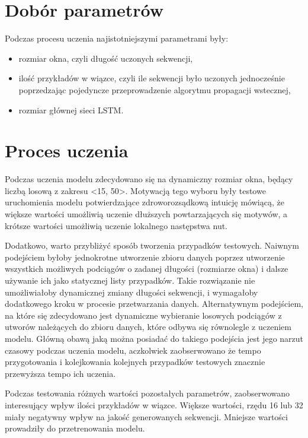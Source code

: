 {    \section{Dobór parametrów}
    {
        Podczas procesu uczenia najistotniejszymi parametrami były:
        \begin{itemize}
            \setlength\itemsep{-0.5em}
            \item rozmiar okna, czyli długość uczonych sekwencji,
            \item ilość przykładów w\,\,wiązce, czyli ile sekwencji było uczonych jednocześnie
            poprzedzając pojedyncze przeprowadzenie algorytmu propagacji wstecznej,
            \item rozmiar głównej sieci LSTM.
        \end{itemize}
    }

    \section{Proces uczenia}
    {
        Podczas uczenia modelu zdecydowano się na dynamiczny rozmiar okna,
        będący liczbą losową z\,\,zakresu <15, 50>. Motywacją tego wyboru były testowe 
        uruchomienia modelu potwierdzające zdroworozsądkową intuicję mówiącą, że większe wartości
        umożliwią uczenie dłuższych powtarzających się motywów, a\,\,krótsze wartości umożliwią uczenie lokalnego następstwa nut.

        Dodatkowo, warto przybliżyć sposób tworzenia przypadków testowych. Naiwnym podejściem byłoby
        jednokrotne utworzenie zbioru danych poprzez utworzenie wszystkich możliwych podciągów o\,\,zadanej
        długości (rozmiarze okna) i\,\,dalsze używanie ich jako statycznej listy przypadków. 
        Takie rozwiązanie nie umożliwiałoby dynamicznej zmiany długości sekwencji, i\,\,wymagałoby dodatkowego 
        kroku w\,\,procesie przetwarzania danych. Alternatywnym podejściem, na które się zdecydowano jest dynamiczne
        wybieranie losowych podciągów z\,\,utworów należących do zbioru danych, które odbywa się równolegle z\,\,uczeniem modelu. 
        Główną obawą jaką można posiadać do takiego podejścia jest jego narzut czasowy podczas uczenia modelu, 
        aczkolwiek zaobserwowano że tempo przygotowania i\,\,kolejkowania kolejnych przypadków testowych znacznie przewyższa tempo ich uczenia.

        \bigskip

        Podczas testowania różnych wartości pozostałych parametrów, zaobserwowano interesujący wpływ ilości przykładów w\,\,wiązce.
        Większe wartości, rzędu 16 lub 32 miały negatywny wpływ na jakość generowanych sekwencji. 
        Mniejsze wartości prowadziły do przetrenowania modelu.

}}
